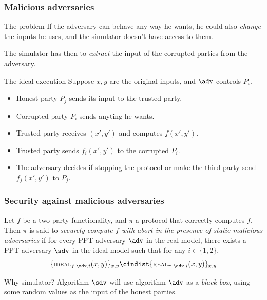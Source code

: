 \documentclass{beamer}
\begin{document}
    \begin{frame}
        \frametitle{Malicious adversaries}
        
        \begin{alertblock}{The problem}
            If the adversary can behave any way he wants, he could also \emph{change} the inputs he uses, and the simulator doesn't have access to them.
            
            The simulator has then to \emph{extract} the input of the corrupted parties from the adversary.
        \end{alertblock}
    
        \begin{block}{The ideal execution}
            Suppose $x,y$ are the original inputs, and $\adv$ controls $P_i$.
            \begin{itemize}
                \item Honest party $P_j$ sends its input to the trusted party.
                \item Corrupted party $P_i$ sends anyting he wants.
                \item Trusted party receives $(x',y')$ and computes $f(x',y')$.
                \item Trusted party sends $f_i(x',y')$ to the corrupted $P_i$.
                \item The adversary decides if stopping the protocol or make the third party send $f_j(x',y')$ to $P_j$.
            \end{itemize}
        \end{block}
    
    \end{frame}

    \begin{frame}
        \frametitle{Security against malicious adversaries}
        
        \begin{definition}
            Let $f$ be a two-party functionality, and $\pi$ a protocol that correctly computes $f$. Then $\pi$ is said to \emph{securely compute $f$ with abort in the presence of static malicious adversaries} if for every PPT adversary $\adv$ in the real model, there exists a PPT adversary $\sdv$ in the ideal model such that for any $i\in\{1,2\}$,
            $$ \{ \textsc{\scriptsize IDEAL}_{f,\sdv,i}(x,y) \}_{x,y} \cindist \{ \textsc{\scriptsize REAL}_{\pi,\adv,i}(x,y) \}_{x,y}$$
        \end{definition}
    
        \begin{exampleblock}{Why simulator?}
            Algorithm $\sdv$ will use algorithm $\adv$ as a \emph{black-box}, using some random values as the input of the honest parties.
        \end{exampleblock}
    \end{frame}
\end{document}
